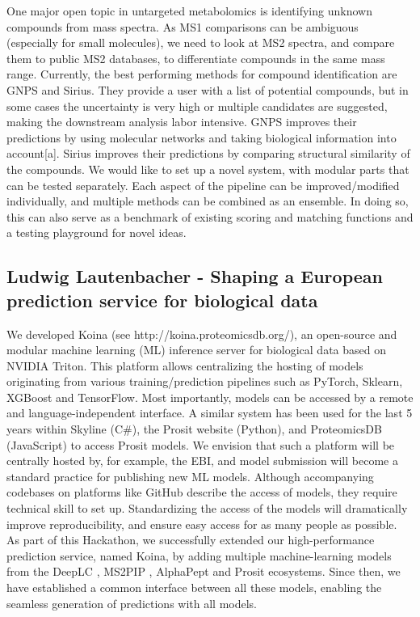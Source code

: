 One major open topic in untargeted metabolomics is identifying unknown compounds from mass spectra. As MS1 comparisons can be ambiguous (especially for small molecules), we need to look at MS2 spectra, and compare them to public MS2 databases, to differentiate compounds in the same mass range. Currently, the best performing methods for compound identification are GNPS and Sirius. They provide a user with a list of potential compounds, but in some cases the uncertainty is very high or multiple candidates are suggested, making the downstream analysis labor intensive. GNPS improves their predictions by using molecular networks and taking biological information into account[a]. Sirius improves their predictions by comparing structural similarity of the compounds. We would like to set up a novel system, with modular parts that can be tested separately. Each aspect of the pipeline can be improved/modified individually, and multiple methods can be combined as an ensemble. In doing so, this can also serve as a benchmark of existing scoring and matching functions and a testing playground for novel ideas.\\

\subsection{Ludwig Lautenbacher - Shaping a European prediction service for biological data}

We developed Koina (see http://koina.proteomicsdb.org/), an open-source and modular machine learning (ML) inference server for biological data based on NVIDIA Triton. This platform allows centralizing the hosting of models originating from various training/prediction pipelines such as PyTorch, Sklearn, XGBoost and TensorFlow. Most importantly, models can be accessed by a remote and language-independent interface. A similar system has been used for the last 5 years within Skyline (C\#), the Prosit website (Python), and ProteomicsDB (JavaScript) to access Prosit models. We envision that such a platform will be centrally hosted by, for example, the EBI, and model submission will become a standard practice for publishing new ML models. Although accompanying codebases on platforms like GitHub describe the access of models, they require technical skill to set up. Standardizing the access of the models will dramatically improve reproducibility, and ensure easy access for as many people as possible.
As part of this Hackathon, we successfully extended our high-performance prediction service, named Koina, by adding multiple machine-learning models from the DeepLC \citep{pmid34711972}, MS2PIP \citep{pmid24078703, pmid25990723}, AlphaPept \citep{pmid36433986} and Prosit \citep{pmid31133760, pmid35549156, pmid34099720} ecosystems. Since then, we have established a common interface between all these models, enabling the seamless generation of predictions with all models.\\


